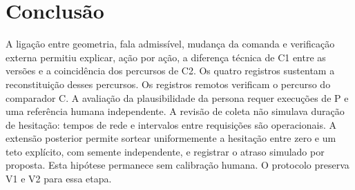 \section{Conclusão}
A ligação entre geometria, fala admissível, mudança da comanda e verificação externa permitiu explicar, ação por ação, a diferença técnica de C1 entre as versões e a coincidência dos percursos de C2. Os quatro registros sustentam a reconstituição desses percursos. Os registros remotos verificam o percurso do comparador C. A avaliação da plausibilidade da persona requer execuções de P e uma referência humana independente. A revisão de coleta não simulava duração de hesitação: tempos de rede e intervalos entre requisições são operacionais. A extensão posterior permite sortear uniformemente a hesitação entre zero e um teto explícito, com semente independente, e registrar o atraso simulado por proposta. Esta hipótese permanece sem calibração humana. O protocolo preserva V1 e V2 para essa etapa.




